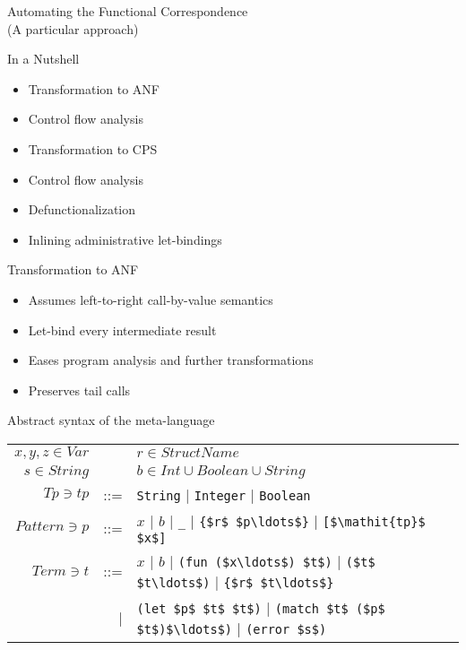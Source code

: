 \documentclass[handout]{beamer}
\begin{document}
\begin{frame}
  \begin{center}
    \LARGE{Automating the Functional Correspondence}\\
    \tiny{(A particular approach)}
  \end{center}
\end{frame}

\begin{frame}{In a Nutshell}
  \begin{itemize}
    \item Transformation to ANF \pause
    \item Control flow analysis \pause
    \item Transformation to CPS \pause
    \item Control flow analysis \pause
    \item Defunctionalization \pause
    \item Inlining administrative let-bindings
  \end{itemize}
\end{frame}

\begin{frame}[fragile]{Transformation to ANF}
  \begin{itemize}
    \item Assumes left-to-right call-by-value semantics \pause
    \item Let-bind every intermediate result \pause
    \item Eases program analysis and further transformations \pause
    \item Preserves tail calls
  \end{itemize}\pause
  \vspace{1\baselineskip}
  \begin{beamerboxesrounded}{Abstract syntax of the meta-language}
  \begin{center}
    \begingroup
    \setlength{\tabcolsep}{2pt}
    \def\arraystretch{1.3}
    \begin{tabular}{rrl}
      $x, y, z \in Var$ && $r\in StructName$\\
      $s \in String$ && $b \in Int \cup Boolean \cup String$\\
      $Tp \ni \mathit{tp} $ &::=& \lstinline!String! | \lstinline!Integer! | \lstinline!Boolean!\\
      $Pattern \ni p $ &::=& $x$ | $b$ | \lstinline!_! | \lstinline!{$r$ $p\ldots$}! |  \lstinline![$\mathit{tp}$ $x$]!\\
      $Term \ni t$ &::=& $x$ | $b$
                  | \lstinline!(fun ($x\ldots$) $t$)!
                  | \lstinline!($t$ $t\ldots$)!
                  | \lstinline!{$r$ $t\ldots$}!\\
                  &|& \lstinline!(let $p$ $t$ $t$)!
                  | \lstinline!(match $t$ ($p$ $t$)$\ldots$)!
                  | \lstinline!(error $s$)!
    \end{tabular}
    \endgroup
    \end{center}
  \end{beamerboxesrounded}
\end{frame}
\end{document}
